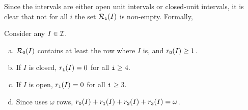 Since the intervals are either open unit intervals or closed-unit intervals,
it is clear that not for all $i$ the set $\mathcal{R}_\texttt{i}(I)$ is non-empty.
Formally,
\begin{lemma}\label{lem:ris}
    Consider any $I\in \mathcal{I}$.
    \begin{enumerate}[(a)]
        \item \label{lem:r0_not_empty} $\mathcal{R}_\texttt{0}(I)$ contains at least the row where $I$ is, and $r_\texttt{\texttt{0}}(I) \geq 1$.
        \item \label{lem:closed_intersects_3}
        If $I$ is closed, $r_\texttt{\texttt{i}}(I) = 0$ for all $\texttt{i}\geq 4$.
        \item \label{lem:open_intersects_2}
        If $I$ is open, $r_\texttt{\texttt{i}}(I) = 0$ for all $\texttt{i}\geq 3$.
        \item \label{Obs:sumrrr}
        Since \opt uses $\omega$ rows, $r_\texttt{\texttt{0}}(I) + r_\texttt{\texttt{1}}(I) + r_\texttt{\texttt{2}}(I) + r_\texttt{\texttt{3}}(I) = \omega$.
    \end{enumerate}
\end{lemma}


